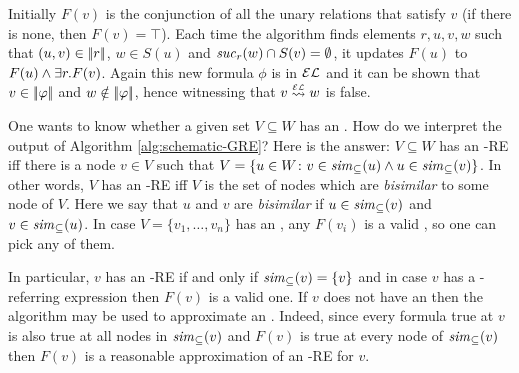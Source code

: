 Initially $F(v)$ is the conjunction of all the unary relations that
satisfy $v$ (if there is none, then $F(v)=\top$).
Each time the algorithm finds elements $r,u,v,w$
such that $(u,v)\in|\!|r|\!|$, $w\in S(u)$ and ${\it suc}_{r}(w)\cap
S(v)=\emptyset$, it updates $F(u)$ to $F(u)\wedge\exists r. F(v)$.
Again this new formula $\phi$ is in $\mathcal{EL}$ and it can be
shown that $v\in|\!|\varphi|\!|$ and $w\notin|\!|\varphi|\!|$, hence
witnessing that $v\simil{\EL} w$ is false.




\iffullversion One wants to know whether a given set $V\subseteq W$
has an \posre. How do we interpret the output of Algorithm
\ref{alg:schematic-GRE}? Here is the answer: $V\subseteq W$ has an
\EL-RE iff there is a node $v\in V$ such that $V=\{u\in W\colon
v\in{\it sim}_\subseteq(u) \wedge u\in{\it sim}_\subseteq(v)\}$. In
other words, $V$ has an \EL-RE iff $V$ is the set of nodes which are
\emph{bisimilar} to some node of $V$. Here we say that $u$ and $v$
are \emph{bisimilar} if $u\in{\it sim}_\subseteq(v)$ and
$v\in{\it sim}_\subseteq(u)$. In case $V=\{v_1,\dots,v_n\}$ has an
\posre, any $F(v_i)$ is a valid \posre, so one can pick any of them.

In particular, $v$ has an \EL-RE if and only if ${\it sim}_\subseteq(v)=\{v\}$
and in case $v$ has a \EL-referring expression then $F(v)$ is a
valid one. If $v$ does not have an \posre then the algorithm may be
used to approximate an \posre. Indeed, since every formula true at
$v$ is also true at all nodes in ${\it sim}_\subseteq(v)$ and $F(v)$
is true at every node of ${\it sim}_\subseteq(v)$ then $F(v)$ is a
reasonable approximation of an \EL-RE for $v$.

